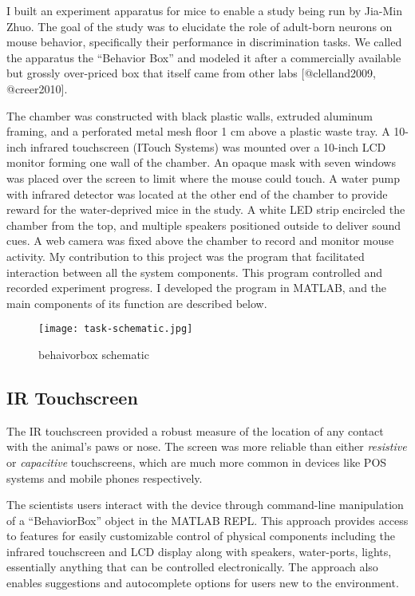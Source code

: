 \documentclass[../main.tex]{subfiles}
\begin{document}
I built an experiment apparatus for mice to enable a study being run by Jia-Min Zhuo.
The goal of the study was to elucidate the role of adult-born neurons on mouse behavior, specifically their performance in discrimination tasks.
We called the apparatus the ``Behavior Box'' and modeled it after a commercially available but grossly over-priced box that itself came from other labs {[}@clelland2009, @creer2010{]}.

The chamber was constructed with black plastic walls, extruded aluminum framing, and a perforated metal mesh floor 1 cm above a plastic waste tray.
A 10-inch infrared touchscreen (ITouch Systems) was mounted over a 10-inch LCD monitor forming one wall of the chamber.
An opaque mask with seven windows was placed over the screen to limit where the mouse could touch.
A water pump with infrared detector was located at the other end of the chamber to provide reward for the water-deprived mice in the study.
A white LED strip encircled the chamber from the top, and multiple speakers positioned outside to deliver sound cues.
A web camera was fixed above the chamber to record and monitor mouse activity.
My contribution to this project was the program that facilitated interaction between all the system components.
This program controlled and recorded experiment progress.
I developed the program in MATLAB, and the main components of its function are described below.

\begin{figure}
	\texttt{[image: task-schematic.jpg]}
	\caption{behaivorbox schematic}
	\label{fig:behaivorbox schematic}
\end{figure}

\subsection{
	IR Touchscreen}\label{sec:ir-touchscreen}

The IR touchscreen provided a robust measure of the location of any contact with the animal's paws or nose.
The screen was more reliable than either \emph{resistive} or \emph{capacitive} touchscreens, which are much more common in devices like POS systems and mobile phones respectively.

The scientists users interact with the device through command-line manipulation of a ``BehaviorBox'' object in the MATLAB REPL.
This approach provides access to features for easily customizable control of physical components including the infrared touchscreen and LCD display along with speakers, water-ports, lights, essentially anything that can be controlled electronically.
The approach also enables suggestions and autocomplete options for users new to the environment.
\end{document}
